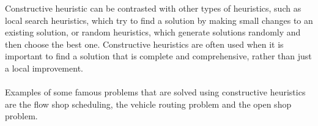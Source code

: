     Constructive heuristic can be contrasted with other types of heuristics, such as local search heuristics, which try to find a solution by making small changes to an existing solution, or random heuristics, which generate solutions randomly and then choose the best one. Constructive heuristics are often used when it is important to find a solution that is complete and comprehensive, rather than just a local improvement.
    \\ \\
    Examples of some famous problems that are solved using constructive heuristics are the flow shop scheduling, the vehicle routing problem and the open shop problem.
    
    
